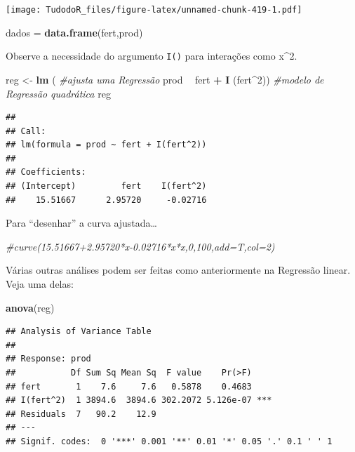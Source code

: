 \documentclass[
]{book}
\newenvironment{Shaded}{\begin{snugshade}}{\end{snugshade}}
\newcommand{\CommentTok}[1]{\textcolor[rgb]{0.56,0.35,0.01}{\textit{#1}}}
\newcommand{\DecValTok}[1]{\textcolor[rgb]{0.00,0.00,0.81}{#1}}
\newcommand{\KeywordTok}[1]{\textcolor[rgb]{0.13,0.29,0.53}{\textbf{#1}}}
\newcommand{\NormalTok}[1]{#1}
\newcommand{\OperatorTok}[1]{\textcolor[rgb]{0.81,0.36,0.00}{\textbf{#1}}}
\newcommand{\StringTok}[1]{\textcolor[rgb]{0.31,0.60,0.02}{#1}}
\begin{document}
\texttt{[image: TudodoR\_files/figure-latex/unnamed-chunk-419-1.pdf]}

\begin{Shaded}
\begin{Highlighting}[]
\NormalTok{dados =}\StringTok{ }\KeywordTok{data.frame}\NormalTok{(fert,prod)}
\end{Highlighting}
\end{Shaded}

Observe a necessidade do argumento \texttt{I()} para interações como x\^{}2.

\begin{Shaded}
\begin{Highlighting}[]
\NormalTok{reg <-}\StringTok{ }\KeywordTok{lm}\NormalTok{ ( }\CommentTok{#ajusta uma Regressão}
\NormalTok{        prod }\OperatorTok{~}\StringTok{ }\NormalTok{fert }\OperatorTok{+}\StringTok{ }\KeywordTok{I}\NormalTok{ (fert}\OperatorTok{^}\DecValTok{2}\NormalTok{)) }\CommentTok{#modelo de Regressão quadrática}
\NormalTok{reg}
\end{Highlighting}
\end{Shaded}

\begin{verbatim}
## 
## Call:
## lm(formula = prod ~ fert + I(fert^2))
## 
## Coefficients:
## (Intercept)         fert    I(fert^2)  
##    15.51667      2.95720     -0.02716
\end{verbatim}

Para ``desenhar'' a curva ajustada\ldots{}

\begin{Shaded}
\begin{Highlighting}[]
\CommentTok{#curve(15.51667+2.95720*x-0.02716*x*x,0,100,add=T,col=2)}
\end{Highlighting}
\end{Shaded}

Várias outras análises podem ser feitas como anteriormente na Regressão linear. Veja uma delas:

\begin{Shaded}
\begin{Highlighting}[]
 \KeywordTok{anova}\NormalTok{(reg)}
\end{Highlighting}
\end{Shaded}

\begin{verbatim}
## Analysis of Variance Table
## 
## Response: prod
##           Df Sum Sq Mean Sq  F value    Pr(>F)    
## fert       1    7.6     7.6   0.5878    0.4683    
## I(fert^2)  1 3894.6  3894.6 302.2072 5.126e-07 ***
## Residuals  7   90.2    12.9                       
## ---
## Signif. codes:  0 '***' 0.001 '**' 0.01 '*' 0.05 '.' 0.1 ' ' 1
\end{verbatim}
\end{document}
